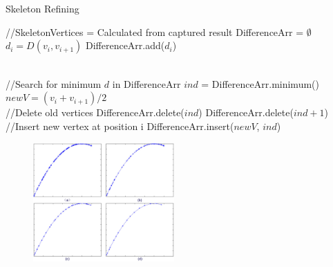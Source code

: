 \documentclass[10pt,journal,compsoc]{IEEEtran}
\begin{document}
    \renewcommand{\algorithmicrequire}{\textbf{Input:}}
    \renewcommand{\algorithmicensure}{\textbf{Output:}}

    \begin{algorithm}
        \caption{Skeleton Refining}
        \label{tbl:skeletonrefining}
        \begin{algorithmic}[1]
            \State //SkeletonVertices = Calculated from captured result
                \State DifferenceArr = $\emptyset$
                    \State $d_i = D(v_{i}, v_{i+1})$
                    \State DifferenceArr.add($d_i$)
                \EndFor

                \\
                \State //Search for minimum $d$ in DifferenceArr
                \State $ind$ = DifferenceArr.minimum()
                \State $newV = (v_{i} + v_{i+1}) /2$
                \\
                \State //Delete old vertices
                \State DifferenceArr.delete($ind$)
                \State DifferenceArr.delete($ind+1$)
                \\
                \State //Insert new vertex at position i
                \State DifferenceArr.insert($newV$, $ind$)

            \EndWhile
        \end{algorithmic}
    \end{algorithm}

\begin{figure}
    \centering
    \includegraphics[width=0.48\textwidth]{figs/lod.jpg}
    \label{fig:skeletonrefining}
\end{figure}
\end{document}
